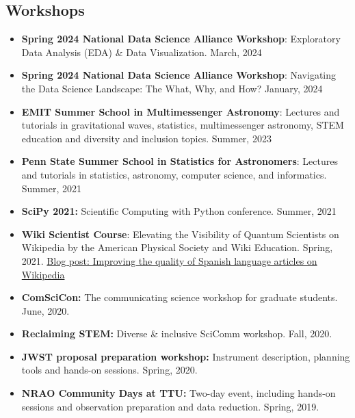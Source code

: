 \documentclass[letterpaper,10pt]{article}
\begin{document}
\subsection*{Workshops}
\begin{itemize}[label=$\blacktriangleright$]

\item \textbf{Spring 2024 National Data Science Alliance Workshop}: Exploratory Data Analysis (EDA) \& Data Visualization. March, 2024


\item \textbf{Spring 2024 National Data Science Alliance Workshop}: Navigating the Data Science Landscape: The What, Why, and How? January, 2024



\item \textbf{EMIT Summer School in Multimessenger Astronomy}: Lectures and tutorials in gravitational waves, statistics, multimessenger astronomy, STEM education and diversity and inclusion topics. Summer, 2023

\item \textbf{Penn State Summer School in Statistics for Astronomers}: Lectures and tutorials in statistics, astronomy, computer science, and informatics. Summer, 2021

\item \textbf{SciPy 2021:} Scientific Computing with Python conference. Summer, 2021
    \item  \textbf{Wiki Scientist Course}: Elevating the Visibility of Quantum Scientists on Wikipedia by the American Physical Society and Wiki Education. Spring, 2021. \href{https://wikiedu.org/blog/2021/05/24/improving-the-quality-of-spanish-language-articles-on-wikipedia/}{Blog post: Improving the quality of Spanish language articles on Wikipedia}
    \item \textbf{ComSciCon:} The communicating science workshop for graduate students. June, 2020.
    \item \textbf{Reclaiming STEM:} Diverse \& inclusive SciComm workshop. Fall, 2020.
    
            \item \textbf{JWST proposal preparation workshop:}  Instrument description, planning tools and hands-on sessions. Spring, 2020.

    
    
    
        \item \textbf{NRAO Community Days at TTU:}  Two-day event, including  hands-on sessions and observation preparation and data reduction. Spring, 2019.


\end{itemize}
\end{document}
